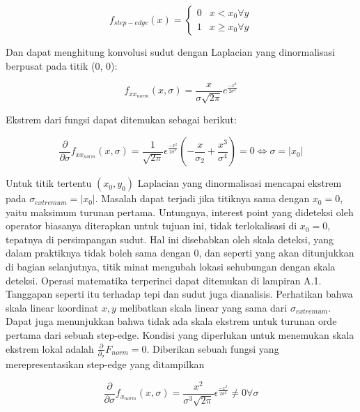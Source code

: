 \begin{equation*}
  f_{step-edge}(x) =
  \begin{cases}
    0 & x < x_{0} \forall y \\
    1 & x \geq x_{0} \forall y
  \end{cases}
\end{equation*}

Dan dapat menghitung konvolusi sudut dengan Laplacian yang dinormalisasi berpusat pada titik (0, 0):

\begin{equation*}
  f_{x x_{norm}}(x,\sigma) = \frac{x}{\sigma \sqrt{2\pi}}e^{\frac{-x^{2}}{2\sigma^{2}}}
\end{equation*}

Ekstrem dari fungsi dapat ditemukan sebagai berikut:

\begin{equation}
  \frac{\partial}{\partial \sigma} f_{xx_{norm}}(x,\sigma) = \frac{1}{\sqrt{2\pi}}\epsilon^{\frac{-x^{2}}{2\sigma^{2}}}(-\frac{x}{\sigma_{2}} + \frac{x^{3}}{\sigma^{4}}) = 0 \Leftrightarrow \sigma = \left\lvert x_{0}\right\rvert 
\end{equation}

Untuk titik tertentu \((x_{0},y_{0})\) Laplacian yang dinormalisasi mencapai ekstrem pada \(\sigma_{extremum}= \left\lvert x_{0}\right\rvert\). 
Masalah dapat terjadi jika titiknya sama dengan \(x_{0} = 0\), yaitu maksimum turunan pertama. Untungnya, interest point yang dideteksi oleh operator biasanya 
diterapkan untuk tujuan ini, tidak terlokalisasi di \(x_{0} =0\), tepatnya di persimpangan sudut. Hal ini disebabkan oleh skala deteksi, yang dalam praktiknya 
tidak boleh sama dengan \(0\), dan seperti yang akan ditunjukkan di bagian selanjutnya, titik minat mengubah lokasi sehubungan dengan skala deteksi. Operasi matematika 
terperinci dapat ditemukan di lampiran A.1. Tanggapan seperti itu terhadap tepi dan sudut juga dianalisis. Perhatikan bahwa skala linear koordinat \(x,y\) melibatkan skala linear yang sama dari \(\sigma_{extremum}\). 
Dapat juga menunjukkan bahwa tidak ada skala ekstrem untuk turunan orde pertama dari sebuah step-edge.
Kondisi yang diperlukan untuk menemukan skala ekstrem lokal adalah \(\frac{\partial}{\partial_{\sigma}}F_{norm} = 0\). 
Diberikan sebuah fungsi yang merepresentasikan step-edge yang ditampilkan 

\begin{equation}
\frac{\partial}{\partial \sigma}f_{x_{norm}}(x,\sigma) = \frac{x^{2}}{\sigma^{3}\sqrt{2\pi}}\epsilon^{\frac{-x^{2}}{2\sigma^{2}}} \neq 0\forall\sigma 
\end{equation}

